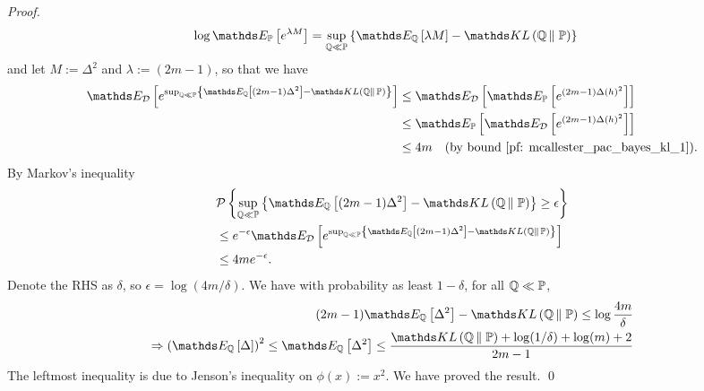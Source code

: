 \documentclass[11pt]{article}
\begin{document}
\begin{itemize}
\begin{proof}
\begin{align*}
\log \E{\bP}{e^{\lambda M}} &= \sup_{\bQ \ll \bP}\set{\E{\bQ}{ \lambda M} - \kl{\bQ}{\bP} }
\end{align*} and let $M:= \Delta^2$ and $\lambda := (2m-1)$, so that  we have
\begin{align}
\E{\cD}{e^{ \sup_{\bQ \ll \bP}\set{\E{\bQ}{ (2m-1) \Delta^2} - \kl{\bQ}{\bP}}}}  &\le \E{\cD}{\E{\bP}{e^{(2m-1) \Delta(h)^2}}} \nonumber \\
&\le \E{\bP}{\E{\cD}{e^{(2m-1) \Delta(h)^2}}} \nonumber\\
&\le 4m  \quad \text{(by bound \eqref{pf: mcallester_pac_bayes_kl_1})}.  \label{pf: mcallester_pac_bayes_kl_2}
\end{align} By Markov's inequality
\begin{align*}
&\cP\set{\sup_{\bQ \ll \bP}\set{\E{\bQ}{ (2m-1) \Delta^2} - \kl{\bQ}{\bP}} \ge \epsilon} \\
&\le e^{-\epsilon} \E{\cD}{e^{ \sup_{\bQ \ll \bP}\set{\E{\bQ}{ (2m-1) \Delta^2} - \kl{\bQ}{\bP}}}}\\
&\le 4m e^{-\epsilon}.
\end{align*} Denote the RHS as $\delta$, so $\epsilon = \log(4m/\delta)$. We have with probability as least $1-\delta$, for all ${\mathbb Q} \ll {\mathbb P}$,
\begin{align*}
(2m-1) \E{\bQ}{\Delta^2} - \kl{\bQ}{\bP} \le \log\frac{4m}{\delta}\\
\Rightarrow \paren{\E{\bQ}{\Delta}}^2 \le \E{\bQ}{\Delta^2} \le \frac{\kl{\bQ}{\bP} + \log(1/\delta) + \log(m) + 2}{2m-1}
\end{align*} The leftmost inequality is due to Jenson's inequality on $\phi(x) := x^2$. We have proved the result. \qed
\end{proof}


\end{itemize}
\end{document}
